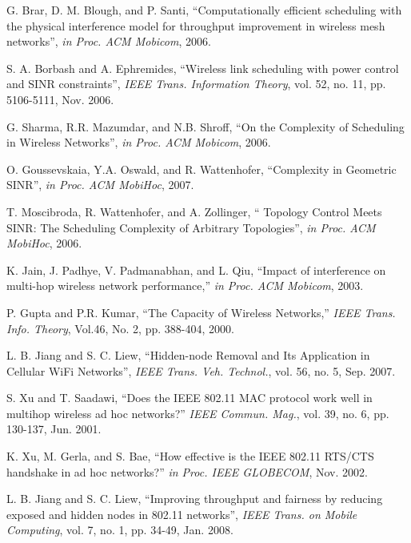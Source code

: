 \documentclass[conference]{IEEEtran}
\begin{document}
\begin{thebibliography}{99}
\providecommand{\url}[1]{#1}

G. Brar, D. M. Blough, and P. Santi, ``Computationally eff\/icient
scheduling with the physical interference model for throughput
improvement in wireless mesh networks'', \textit{in Proc. ACM
Mobicom}, 2006.



S. A. Borbash and A. Ephremides, ``Wireless link scheduling with
power control and SINR constraints'', \textit{IEEE Trans.
Information Theory}, vol. 52, no. 11, pp. 5106-5111, Nov. 2006.

G. Sharma, R.R. Mazumdar, and N.B. Shroff, ``On the Complexity of
Scheduling in Wireless Networks'', \textit{in Proc. ACM Mobicom},
2006.



O. Goussevskaia, Y.A. Oswald, and R. Wattenhofer, ``Complexity in
Geometric SINR'', \textit{in Proc. ACM MobiHoc}, 2007.



T. Moscibroda, R. Wattenhofer, and A. Zollinger, `` Topology Control
Meets SINR: The Scheduling Complexity of Arbitrary Topologies'',
 \textit{in Proc. ACM MobiHoc}, 2006.



K. Jain, J. Padhye, V. Padmanabhan, and L. Qiu, ``Impact of
interference on multi-hop wireless network performance,'' \textit{in
Proc. ACM Mobicom}, 2003.



P. Gupta and P.R. Kumar, ``The Capacity of Wireless Networks,''
\textit{IEEE Trans. Info. Theory}, Vol.46, No. 2, pp. 388-404, 2000.

L. B. Jiang and S. C. Liew, ``Hidden-node Removal and Its
Application in Cellular WiFi Networks'', \textit{IEEE Trans. Veh.
Technol.}, vol. 56, no. 5, Sep. 2007.

S. Xu and T. Saadawi, ``Does the IEEE 802.11 MAC protocol work well
in multihop wireless ad hoc networks?'' \textit{IEEE Commun. Mag.},
vol. 39, no. 6, pp. 130-137, Jun. 2001.

K. Xu, M. Gerla, and S. Bae, ``How effective is the IEEE 802.11
RTS/CTS handshake in ad hoc networks?'' \textit{in Proc. IEEE
GLOBECOM}, Nov. 2002.

L. B. Jiang and S. C. Liew, ``Improving throughput and fairness by
reducing exposed and hidden nodes in 802.11 networks'', \textit{IEEE
Trans. on Mobile Computing}, vol. 7, no. 1, pp. 34-49, Jan. 2008.




\end{thebibliography}
\end{document}
